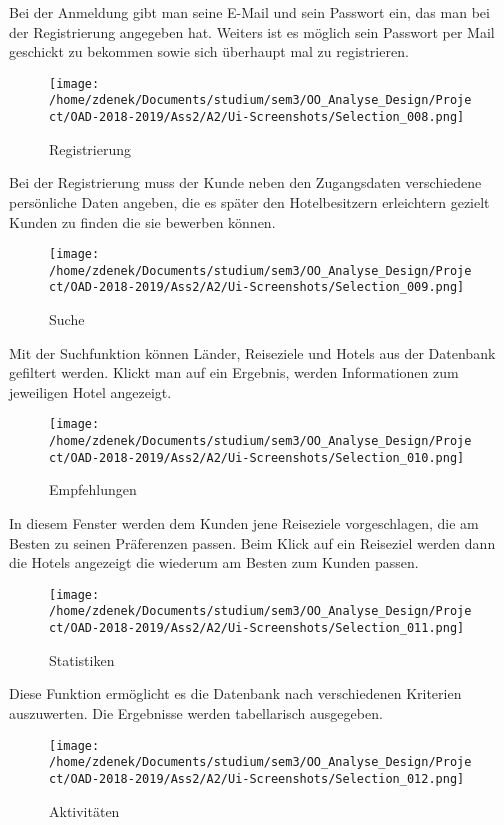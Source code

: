\documentclass[a4paper]{article}
\begin{document}
Bei der Anmeldung gibt man seine E-Mail und sein Passwort ein, das man bei der Registrierung angegeben hat. Weiters ist es möglich sein Passwort per Mail geschickt zu bekommen sowie sich überhaupt mal zu registrieren.

\begin{figure}[h]
\centering
\caption{Registrierung}
\texttt{[image: /home/zdenek/Documents/studium/sem3/OO\_Analyse\_Design/Project/OAD-2018-2019/Ass2/A2/Ui-Screenshots/Selection\_008.png]}
\end{figure}

Bei der Registrierung muss der Kunde neben den Zugangsdaten verschiedene persönliche Daten angeben, die es später den Hotelbesitzern erleichtern gezielt Kunden zu finden die sie bewerben können.


\begin{figure}[h]
\centering
\caption{Suche}
\texttt{[image: /home/zdenek/Documents/studium/sem3/OO\_Analyse\_Design/Project/OAD-2018-2019/Ass2/A2/Ui-Screenshots/Selection\_009.png]}
\end{figure}

Mit der Suchfunktion können Länder, Reiseziele und Hotels aus der Datenbank gefiltert werden. Klickt man auf ein Ergebnis, werden Informationen zum jeweiligen Hotel angezeigt.


\begin{figure}[h]
\centering
\caption{Empfehlungen}
\texttt{[image: /home/zdenek/Documents/studium/sem3/OO\_Analyse\_Design/Project/OAD-2018-2019/Ass2/A2/Ui-Screenshots/Selection\_010.png]}
\end{figure}

In diesem Fenster werden dem Kunden jene Reiseziele vorgeschlagen, die am Besten zu seinen Präferenzen passen. Beim Klick auf ein Reiseziel werden dann die Hotels angezeigt die wiederum am Besten zum Kunden passen.

\begin{figure}[h]
\centering
\caption{Statistiken}
\texttt{[image: /home/zdenek/Documents/studium/sem3/OO\_Analyse\_Design/Project/OAD-2018-2019/Ass2/A2/Ui-Screenshots/Selection\_011.png]}
\end{figure}

Diese Funktion ermöglicht es die Datenbank nach verschiedenen Kriterien auszuwerten.
Die Ergebnisse werden tabellarisch ausgegeben.

\begin{figure}[h]
\centering
\caption{Aktivitäten}
\texttt{[image: /home/zdenek/Documents/studium/sem3/OO\_Analyse\_Design/Project/OAD-2018-2019/Ass2/A2/Ui-Screenshots/Selection\_012.png]}
\end{figure}
\end{document}
